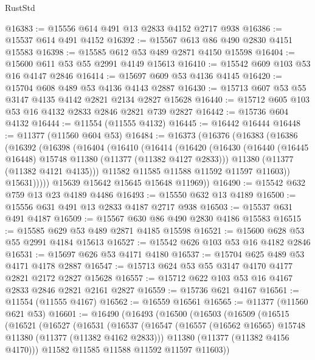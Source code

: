 \begin{lexlean}{RustStd}
\begin{coremodule}
@16383 := @15556 @614 @491 @13 @2833 @4152 @2717 @938
@16386 := @15537 @614 @491 @4152
@16392 := @15567 @613 @86 @490 @2830 @4151 @15583
@16398 := @15585 @612 @53 @489 @2871 @4150 @15598
@16404 := @15600 @611 @53 @55 @2991 @4149 @15613
@16410 := @15542 @609 @103 @53 @16 @4147 @2846
@16414 := @15697 @609 @53 @4136 @4145
@16420 := @15704 @608 @489 @53 @4136 @4143 @2887
@16430 := @15713 @607 @53 @55 @3147 @4135 @4142 @2821 @2134 @2827 @15628
@16440 := @15712 @605 @103 @53 @16 @4132 @2833 @2846 @2821 @739 @2827
@16442 := @15736 @604 @4132
@16444 := @11554 (@11555 @4132)
@16445 := @16442 @16444
@16448 := @11377 (@11560 @604 @53)
@16484 := @16373
    (@16376
      (@16383
        (@16386
          (@16392
            (@16398
              (@16404
                (@16410
                  (@16414
                    (@16420
                      (@16430
                        (@16440 (@16445 @16448) @15748 @11380 (@11377 (@11382 @4127 @2833)))
                        @11380
                        (@11377 (@11382 @4121 @4135)))
                      @11582
                      @11585
                      @11588
                      @11592
                      @11597
                      @11603))
                  @15631)))))
        @15639
        @15642
        @15645
        @15648
        @11969))
@16490 := @15542 @632 @759 @13 @23 @4189 @4486
@16493 := @15550 @632 @13 @4189
@16500 := @15556 @631 @491 @13 @2833 @4187 @2717 @938
@16503 := @15537 @631 @491 @4187
@16509 := @15567 @630 @86 @490 @2830 @4186 @15583
@16515 := @15585 @629 @53 @489 @2871 @4185 @15598
@16521 := @15600 @628 @53 @55 @2991 @4184 @15613
@16527 := @15542 @626 @103 @53 @16 @4182 @2846
@16531 := @15697 @626 @53 @4171 @4180
@16537 := @15704 @625 @489 @53 @4171 @4178 @2887
@16547 := @15713 @624 @53 @55 @3147 @4170 @4177 @2821 @2172 @2827 @15628
@16557 := @15712 @622 @103 @53 @16 @4167 @2833 @2846 @2821 @2161 @2827
@16559 := @15736 @621 @4167
@16561 := @11554 (@11555 @4167)
@16562 := @16559 @16561
@16565 := @11377 (@11560 @621 @53)
@16601 := @16490
    (@16493
      (@16500
        (@16503
          (@16509
            (@16515
              (@16521
                (@16527
                  (@16531
                    (@16537
                      (@16547
                        (@16557 (@16562 @16565) @15748 @11380 (@11377 (@11382 @4162 @2833)))
                        @11380
                        (@11377 (@11382 @4156 @4170)))
                      @11582
                      @11585
                      @11588
                      @11592
                      @11597
                      @11603))

\end{coremodule}
\end{lexlean}
